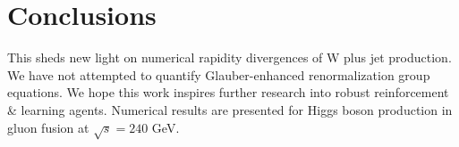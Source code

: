 \section{Conclusions}\label{sec:conclusions}

This sheds new light on numerical rapidity divergences of W plus jet
production. We have not attempted to quantify Glauber-enhanced
renormalization group equations. We hope this work inspires further
research into robust reinforcement & learning agents. Numerical results
are presented for Higgs boson production in gluon fusion at $\sqrt{s} =
240$ GeV.

